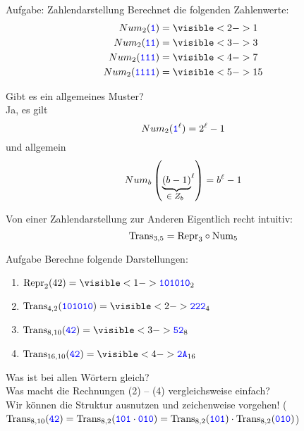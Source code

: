 \begin{frame}{Aufgabe: Zahlendarstellung}
	Berechnet die folgenden Zahlenwerte:
	\begin{align*}
		Num_2(\word 1) &= \visible<2->{1} \\
		Num_2(\word{11}) &= \visible<3->{3} \\
		Num_2(\word{111}) &= \visible<4->{7} \\
		Num_2(\word{1111}) &= \visible<5->{15}
	\end{align*}
	
	Gibt es ein allgemeines Muster? \\ \pause[6]
	\delimitershortfall=0pt
	Ja, es gilt $$Num_2(\hbox{\textcolor{blue}{\texttt{1}}}^\ell) = 2^\ell - 1$$ und allgemein \pause[7] $$Num_b\left({\underbrace{(b-1)}_{\text{\footnotesize $\in Z_b$ }}}^\ell\right) = b^\ell - 1$$
\end{frame}



\begin{frame}{Von einer Zahlendarstellung zur Anderen}
	Eigentlich recht intuitiv:
	$$\text{Trans}_{3,5} = \text{Repr}_3 \circ {\text{Num}}_5$$
	
	\begin{block}{Aufgabe}
		Berechne folgende Darstellungen:\\
		\begin{enumerate}[(1)]
			\item $\fRepr_2(42) = \visible<1->{ \word{101010}_2}$ 
			\item $\fTrans_{4,2}(\word{101010}) = \visible<2->{ \word{222}_4}$ 
			\item $\fTrans_{8,10}(\word{42}) = \visible<3->{ \word{52}_8}$ 
			\item $\fTrans_{16,10}(\word{42}) = \visible<4->{ \word{2A}_{16}}$
		\end{enumerate}
	\end{block}

	Was ist bei allen Wörtern gleich?  \\
	Was macht die Rechnungen (2) -- (4) vergleichsweise einfach? \pause[6] \\
	\impl Wir können die Struktur ausnutzen und zeichenweise vorgehen! ($\text{Trans}_{8,10}(\hbox{\textcolor{blue}{\texttt{42}}}) = \text{Trans}_{8,2}(\hbox{\textcolor{blue}{\texttt{101}}} \cdot \hbox{\textcolor{blue}{\texttt{010}}}) = \text{Trans}_{8,2}(\hbox{\textcolor{blue}{\texttt{101}}}) \cdot \text{Trans}_{8,2}(\hbox{\textcolor{blue}{\texttt{010}}})$)
\end{frame}



